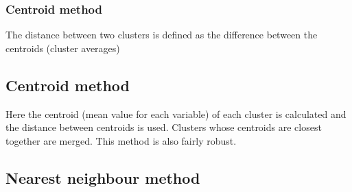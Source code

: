 \documentclass[a4paper,12pt]{report}
\begin{document}
\subsubsection{Centroid method}
The distance between two clusters is defined as the
difference between the centroids (cluster averages)


\subsection{Centroid method}
Here the centroid (mean value for each variable) of each cluster is calculated and the
distance between centroids is used. Clusters whose centroids are closest together are
merged. This method is also fairly robust.

\subsection{Nearest neighbour method} 
\end{document}
